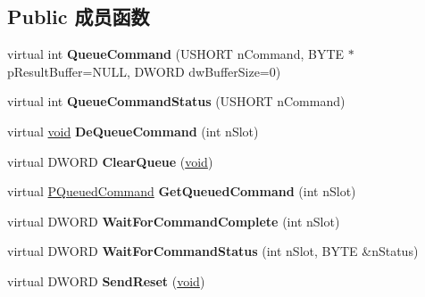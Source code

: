 \subsection*{Public 成员函数}
\begin{DoxyCompactItemize}
\item 
\mbox{\label{class_c_hci_local_a2d642bafebe26107e63fe19d54636812}} 
virtual int {\bfseries Queue\+Command} (U\+S\+H\+O\+RT n\+Command, B\+Y\+TE $\ast$p\+Result\+Buffer=N\+U\+LL, D\+W\+O\+RD dw\+Buffer\+Size=0)
\item 
\mbox{\label{class_c_hci_local_a4721470a470d95582544823a6df1a5a5}} 
virtual int {\bfseries Queue\+Command\+Status} (U\+S\+H\+O\+RT n\+Command)
\item 
\mbox{\label{class_c_hci_local_a386e76b3acf3cdc4a5c2daafaf250dcf}} 
virtual \hyperlink{interfacevoid}{void} {\bfseries De\+Queue\+Command} (int n\+Slot)
\item 
\mbox{\label{class_c_hci_local_a5ead8a1f71a228142023d4a7f8fbed7d}} 
virtual D\+W\+O\+RD {\bfseries Clear\+Queue} (\hyperlink{interfacevoid}{void})
\item 
\mbox{\label{class_c_hci_local_a76f19e721e196b00590f79db88e1f873}} 
virtual \hyperlink{struct___queued_command}{P\+Queued\+Command} {\bfseries Get\+Queued\+Command} (int n\+Slot)
\item 
\mbox{\label{class_c_hci_local_a00828556354972329144ccfaa482c610}} 
virtual D\+W\+O\+RD {\bfseries Wait\+For\+Command\+Complete} (int n\+Slot)
\item 
\mbox{\label{class_c_hci_local_a68b9bc287b34ddf3c7a4ce880fb1dd06}} 
virtual D\+W\+O\+RD {\bfseries Wait\+For\+Command\+Status} (int n\+Slot, B\+Y\+TE \&n\+Status)
\item 
\mbox{\label{class_c_hci_local_a4c2b4429338dc1c329ef654b86042fac}} 
virtual D\+W\+O\+RD {\bfseries Send\+Reset} (\hyperlink{interfacevoid}{void})
\item 
\mbox{\label{class_c_hci_local_afe138ac2a4d4099ac23173328e2c36c9}} 

\end{DoxyCompactItemize}
